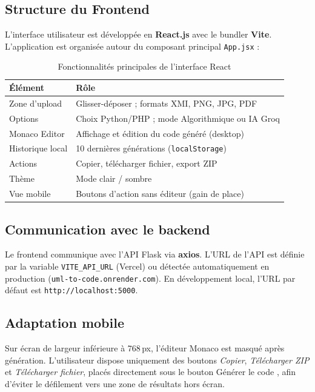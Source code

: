\subsection{Structure du Frontend}

L'interface utilisateur est développée en \textbf{React.js} avec le bundler \textbf{Vite}. L'application est organisée autour du composant principal \texttt{App.jsx} :

\begin{table}[htbp]
\centering
\renewcommand{\arraystretch}{1.4}
\begin{tabular}{|l|p{8cm}|}
\hline
\rowcolor{gray!30}
\textbf{Élément} & \textbf{Rôle} \\
\hline
Zone d'upload & Glisser-déposer ; formats XMI, PNG, JPG, PDF \\
\hline
Options & Choix Python/PHP ; mode Algorithmique ou IA Groq \\
\hline
Monaco Editor & Affichage et édition du code généré (desktop) \\
\hline
Historique local & 10 dernières générations (\texttt{localStorage}) \\
\hline
Actions & Copier, télécharger fichier, export ZIP \\
\hline
Thème & Mode clair / sombre \\
\hline
Vue mobile & Boutons d'action sans éditeur (gain de place) \\
\hline
\end{tabular}
\caption{Fonctionnalités principales de l'interface React}
\end{table}

\subsection{Communication avec le backend}

Le frontend communique avec l'API Flask via \textbf{axios}. L'URL de l'API est définie par la variable \texttt{VITE\_API\_URL} (Vercel) ou détectée automatiquement en production (\texttt{uml-to-code.onrender.com}). En développement local, l'URL par défaut est \texttt{http://localhost:5000}.

\subsection{Adaptation mobile}

Sur écran de largeur inférieure à 768\,px, l'éditeur Monaco est masqué après génération. L'utilisateur dispose uniquement des boutons \textit{Copier}, \textit{Télécharger ZIP} et \textit{Télécharger fichier}, placés directement sous le bouton \og Générer le code \fg{}, afin d'éviter le défilement vers une zone de résultats hors écran.

